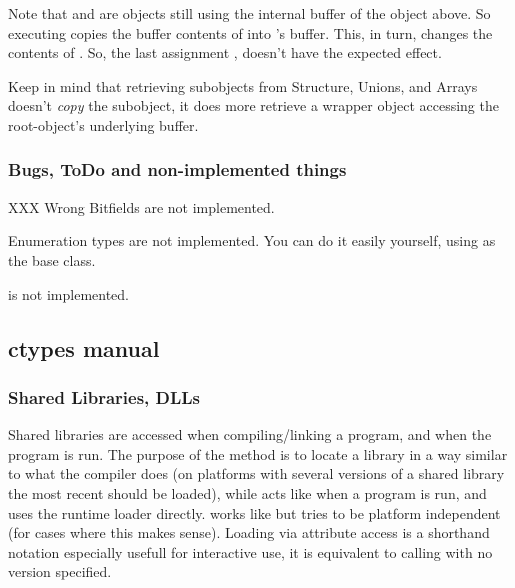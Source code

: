 Note that  and  are objects still using the internal
buffer of the  object above. So executing 
copies the buffer contents of  into  's buffer.  This,
in turn, changes the contents of . So, the last assignment
, doesn't have the expected effect.

Keep in mind that retrieving subobjects from Structure, Unions, and
Arrays doesn't \emph{copy} the subobject, it does more retrieve a wrapper
object accessing the root-object's underlying buffer.


\subsubsection{Bugs, ToDo and non-implemented things\label{ctypes-bugs-todo-non-implemented-things}}

\begin{datadescni}{XXX Wrong}
Bitfields are not implemented.

Enumeration types are not implemented. You can do it easily
yourself, using  as the base class.

 is not implemented.
\end{datadescni}


\subsection{ctypes manual\label{ctypes-ctypes-manual}}


\subsubsection{Shared Libraries, DLLs\label{ctypes-shared-libraries-dlls}}

Shared libraries are accessed when compiling/linking a program, and
when the program is run. The purpose of the  method is to
locate a library in a way similar to what the compiler does (on
platforms with several versions of a shared library the most recent
should be loaded), while  acts like when a program is run, and
uses the runtime loader directly.  works like 
but tries to be platform independent (for cases where this makes
sense). Loading via attribute access is a shorthand notation
especially usefull for interactive use, it is equivalent to calling
 with no version specified.


